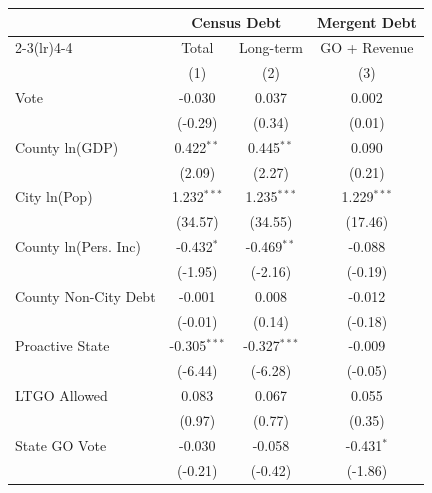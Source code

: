 \begingroup
\centering
\begin{tabular*}{\textwidth}{@{\extracolsep{\fill}}lccc}
   \toprule
                               & \multicolumn{2}{c}{Census Debt} & \multicolumn{1}{c}{Mergent Debt}\\  
   \cmidrule(lr){2-3}\cmidrule(lr){4-4}
                               & Total             & Long-term             & GO + Revenue \\   
                               & (1)               & (2)                   & (3)\\  
   \midrule 
   Vote                        & -0.030            & 0.037                 & 0.002\\   
                               & (-0.29)          & (0.34)               & (0.01)\\   
   County ln(GDP)              & 0.422$^{**}$      & 0.445$^{**}$          & 0.090\\   
                               & (2.09)           & (2.27)               & (0.21)\\   
   City ln(Pop)                & 1.232$^{***}$     & 1.235$^{***}$         & 1.229$^{***}$\\   
                               & (34.57)          & (34.55)              & (17.46)\\   
   County ln(Pers. Inc)        & -0.432$^{*}$      & -0.469$^{**}$         & -0.088\\   
                               & (-1.95)          & (-2.16)              & (-0.19)\\   
   County Non-City Debt        & -0.001            & 0.008                 & -0.012\\   
                               & (-0.01)          & (0.14)               & (-0.18)\\   
   Proactive State             & -0.305$^{***}$    & -0.327$^{***}$        & -0.009\\   
                               & (-6.44)          & (-6.28)              & (-0.05)\\   
   LTGO Allowed                & 0.083             & 0.067                 & 0.055\\   
                               & (0.97)           & (0.77)               & (0.35)\\   
   State GO Vote               & -0.030            & -0.058                & -0.431$^{*}$\\   
                               & (-0.21)          & (-0.42)              & (-1.86)\\   

\end{tabular*}
